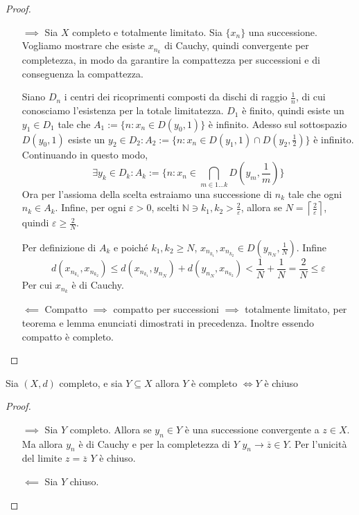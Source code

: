 \begin{proof}\( \)
\begin{itemize}
    \item[\(\implies \)] Sia \(X\) completo e totalmente limitato. Sia
        \(\{x_{n}\}\) una successione. Vogliamo mostrare che esiste \(x_{n_k}\)
        di Cauchy, quindi convergente per completezza, in modo da garantire la
        compattezza per successioni e di conseguenza la compattezza.

        Siano \(D_n\) i centri dei ricoprimenti composti da dischi di raggio
        \(\frac{1}{n}\), di cui conosciamo l'esistenza per la totale
        limitatezza. \(D_{1}\) è finito, quindi esiste un \(y_{1} \in D_{1}\)
        tale che \(A_{1} := \{n: x_{n} \in D(y_{0}, 1)\} \) è infinito. Adesso sul
        sottospazio \(D(y_{0}, 1)\) esiste un \(y_{2} \in D_{2} : A_{2} := \{n:
        x_{n} \in D(y_{1}, 1) \cap D(y_{2}, \frac{1}{2})\} \) è infinito.
        Continuando in questo modo, \[\exists y_k \in D_k : A_k := \{n : x_{n} \in
        \bigcap_{m \in 1\dots k} D\left( y_m, \frac{1}{m} \right)  \} \] 
        Ora per l'assioma della scelta estraiamo una successione di \(n_k\) tale
        che ogni \(n_k \in A_k\). Infine, per ogni \(\varepsilon > 0\), scelti
        \(\mathbb{N} \ni k_{1}, k_{2} > \frac{2}{\varepsilon}\), allora se \(N =
        \left\lceil \frac{2}{\varepsilon} \right\rceil \), quindi \(\varepsilon
        \ge \frac{2}{N}\).

        Per definizione di \(A_k\) e poiché \(k_{1}, k_{2} \ge N\), 
        \(x_{n_{k_{1}}}, x_{n_{k_{2}}} \in D\left( y_{n_N}, \frac{1}{N} \right) \).
        Infine
        \[d(x_{n_{k_{1}}}, x_{n_{k_{2}}}) \le d(x_{n_{k_{1}}}, y_{n_N}) +
            d(y_{n_N},
        x_{n_{k_{2}}}) < \frac{1}{N} + \frac{1}{N} = \frac{2}{N} \le \varepsilon\] 
        Per cui \(x_{n_k}\) è di Cauchy.
        
    \item[\(\impliedby \)] Compatto \(\implies \) compatto per successioni
        \(\implies \) totalmente limitato, per teorema e lemma enunciati
        dimostrati in precedenza. Inoltre essendo compatto è completo.
\end{itemize}
\end{proof}
\begin{proposition}
    Sia \((X, d)\) completo, e sia \(Y \subseteq X \) allora \(Y\) è completo
    \(\iff Y\) è chiuso
\end{proposition}
\begin{proof}\( \)
\begin{itemize}
    \item[\(\implies \)] Sia \(Y\) completo. Allora se \(y_{n} \in Y\) è una
        successione convergente a \(z \in X\). Ma allora \(y_{n}\) è di Cauchy e
        per la completezza di \(Y\) \(y_{n} \to \overline{z} \in Y\). Per
        l'unicità del limite \(z = \overline{z}\) \(Y\) è chiuso.
    \item[\(\impliedby \)] Sia \(Y\) chiuso. 
\end{itemize}
\end{proof}

